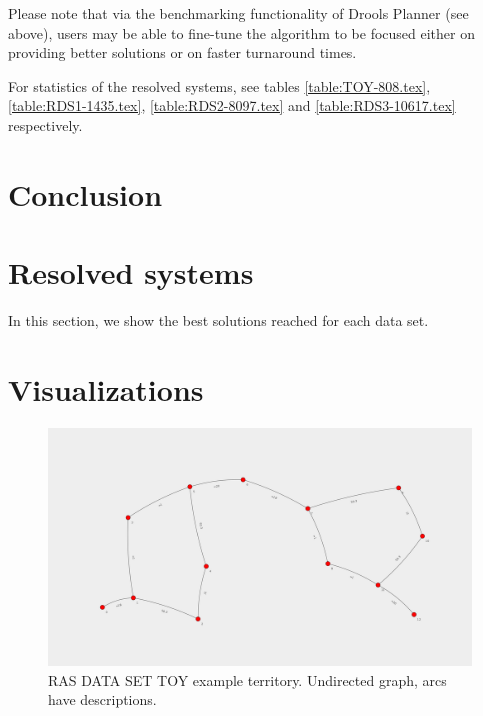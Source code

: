\documentclass[10pt,a4paper,draft]{article}
\begin{document}
Please note that via the benchmarking functionality of Drools Planner (see above), users may be able to fine-tune the algorithm to be focused either on providing better solutions or on faster turnaround times.

For statistics of the resolved systems, see tables \ref{table:TOY-808.tex}, \ref{table:RDS1-1435.tex}, \ref{table:RDS2-8097.tex} and \ref{table:RDS3-10617.tex} respectively. 

\section{Conclusion}

\appendix

\section{Resolved systems}

In this section, we show the best solutions reached for each data set. 






\section{Visualizations}

\begin{figure}
\centering
\includegraphics[width=150mm,angle=90]{solution.png}
\caption{RAS DATA SET TOY example territory. Undirected graph, arcs have descriptions.}
\end{figure}
\end{document}
